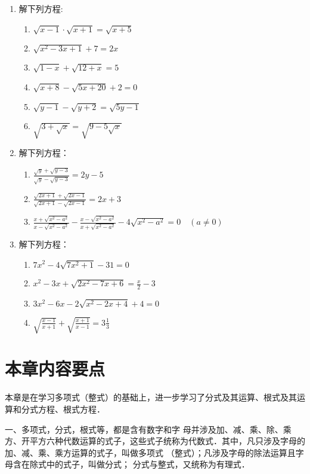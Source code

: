 \begin{enumerate}
\item 解下列方程:
\begin{multicols}{2}
    \begin{enumerate}
\item $\sqrt{x-1} \cdot \sqrt{x+1}=\sqrt{x+5}$
\item $\sqrt{x^{2}-3 x+1}+7=2 x$
\item $\sqrt{1-x}+\sqrt{12+x}=5$
\item $\sqrt{x+8}-\sqrt{5 x+20}+2=0$
\item $\sqrt{y-1}-\sqrt{y+2}=\sqrt{5 y-1}$
\item $\sqrt{3+\sqrt{x}}=\sqrt{9-5 \sqrt{x}}$
\end{enumerate}
\end{multicols}



\item 解下列方程：
\begin{enumerate}
\item $\frac{\sqrt{y}+\sqrt{y-3}}{\sqrt{y}-\sqrt{y-3}}=2 y-5$
\item $\frac{\sqrt{2 x+1}+\sqrt{2 x-1}}{\sqrt{2 x+1}-\sqrt{2 x-1}}=2 x+3$ 
\item  $\frac{x+\sqrt{x^{2}-a^{2}}}{x-\sqrt{x^{2}-a^{2}}}-\frac{x-\sqrt{x^{2}-a^{2}}}{x+\sqrt{x^{2}-a^{2}}}-4 \sqrt{x^{2}-a^{2}}=0\quad (a \neq 0)$
\end{enumerate}

\item 解下列方程：
\begin{enumerate}
\item  $7 x^{2}-4 \sqrt{7 x^{2}+1}-31=0$
\item  $x^{2}-3 x+\sqrt{2 x^{2}-7 x+6}=\frac{x}{2}-3$ 
\item $3 x^{2}-6 x-2 \sqrt{x^{2}-2 x+4}+4=0$
\item  $\sqrt{\frac{x-1}{x+1}}+\sqrt{\frac{x+1}{x-1}}=3 \frac{1}{3}$
\end{enumerate}

\end{enumerate}


\section*{本章内容要点}

本章是在学习多项式（整式）的基础上，进一步学习了分式及其运算、根式及其运算和分式方程、根式方程．

一、多项式，分式，根式等，都是含有数字和字
母并涉及加、减、乘、除、乘方、开平方六种代数运算的式子，这些式子统称为代数式．其中，凡只涉及字母的加、减、乘、乘方运算的式子，叫做多项式
（整式）；凡涉及字母的除法运算且字母含在除式中的式子，叫做分式；
分式与整式，又统称为有理式．

